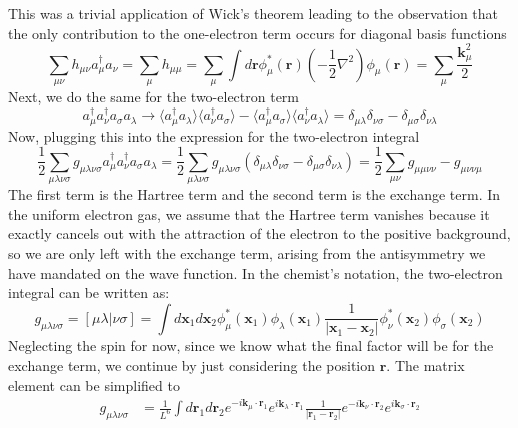\documentclass[12pt]{article}
\begin{document}
This was a trivial application of Wick's theorem leading to the observation that the only contribution to the one-electron term occurs for diagonal basis functions
\begin{equation}
    \sum_{\mu\nu} h_{\mu\nu} a^\dagger_\mu a_\nu = \sum_\mu h_{\mu\mu}= \sum_{\mu} \int d\mathbf{r} \phi^*_\mu(\mathbf{r}) \left( -\frac{1}{2} \nabla^2 \right) \phi_\mu(\mathbf{r}) = \sum_{\mu} \frac{\mathbf{k}_\mu^2}{2}
\end{equation}
Next, we do the same for the two-electron term
\begin{equation}
    a^\dagger_\mu a^\dagger_\nu a_\sigma a_\lambda \rightarrow \langle a^\dagger_\mu a_\lambda \rangle \langle a^\dagger_\nu a_\sigma \rangle - \langle a^\dagger_\mu a_\sigma \rangle \langle a^\dagger_\nu a_\lambda \rangle = \delta_{\mu\lambda} \delta_{\nu\sigma} - \delta_{\mu\sigma} \delta_{\nu\lambda}
\end{equation}
Now, plugging this into the expression for the two-electron integral
\begin{equation}
    \frac{1}{2} \sum_{\mu\lambda\nu\sigma} g_{\mu\lambda\nu\sigma} a^\dagger_\mu a^\dagger_\nu a_\sigma a_\lambda = \frac{1}{2} \sum_{\mu\lambda\nu\sigma} g_{\mu\lambda\nu\sigma} \left( \delta_{\mu\lambda} \delta_{\nu\sigma} - \delta_{\mu\sigma} \delta_{\nu\lambda} \right) = \frac{1}{2} \sum_{\mu\nu} g_{\mu\mu\nu\nu} - g_{\mu\nu\nu\mu}
\end{equation}
The first term is the Hartree term and the second term is the exchange term. In the uniform electron gas, we assume that the Hartree term vanishes because it exactly cancels out with the attraction of the electron to the positive background, so we are only left with the exchange term, arising from the antisymmetry we have mandated on the wave function. In the chemist's notation, the two-electron integral can be written as:
\begin{equation}
    g_{\mu\lambda\nu\sigma} = [\mu\lambda|\nu\sigma] = \int d\mathbf{x}_1 d\mathbf{x}_2 \phi^*_\mu(\mathbf{x}_1) \phi_\lambda(\mathbf{x}_1) \frac{1}{|\mathbf{x}_1 - \mathbf{x}_2|} \phi^*_\nu(\mathbf{x}_2) \phi_\sigma(\mathbf{x}_2)
\end{equation}
Neglecting the spin for now, since we know what the final factor will be for the exchange term, we continue by just considering the position $\mathbf{r}$.
The matrix element can be simplified to
\begin{equation}
\begin{aligned}
    g_{\mu\lambda\nu\sigma} &=\frac{1}{L^6} \int d\mathbf{r}_1 d\mathbf{r}_2 e^{-i\mathbf{k}_\mu\cdot\mathbf{r}_1} e^{i\mathbf{k}_\lambda\cdot\mathbf{r}_1} \frac{1}{|\mathbf{r}_1 - \mathbf{r}_2|} e^{-i\mathbf{k}_\nu\cdot\mathbf{r}_2} e^{i\mathbf{k}_\sigma\cdot\mathbf{r}_2} \\
\end{aligned}
\end{equation}
\end{document}
